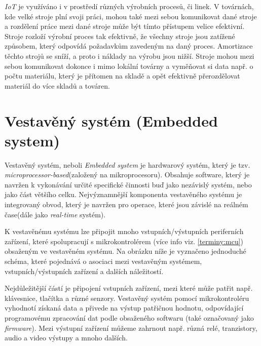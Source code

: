 \emph{IoT} je využíváno i v prostředí různých výrobních procesů, či linek.
V továrnách, kde velké stroje plní svoji práci, mohou také mezi sebou komunikovat dané stroje a rozdělení práce mezi dané stroje může být tímto přístupem velice efektivní.
Stroje rozloží výrobní proces tak efektivně, že všechny stroje jsou zatížené způsobem, který odpovídá požadavkům zavedeným na daný proces.
Amortizace těchto strojů se sníží, a proto i náklady na výrobu jsou nižší.
Stroje mohou mezi sebou komunikovat dokonce i mimo lokální továrny a vyměňovat si data např. o počtu materiálu, který je přítomen na skladě a opět efektivně přerozdělovat materiál do více skladů a továren.

\newpage

\section{Vestavěný systém (Embedded system)}
\label{terminy:vestaveny}

Vestavěný systém, neboli \emph{Embedded system} je hardwarový systém, který je tzv. \emph{microprocessor-based}(založený na mikroprocesoru).
Obsahuje software, který je navržen k vykonávání určité specifické činnosti buď jako nezávislý systém, nebo jako část většího celku.
Nejvýznamnější komponenta vestavěného systému je integrovaný obvod, který je navržen pro operace, které jsou závislé na reálném čase(dále jako \emph{real-time} systém).~\cite{embedded:info}

K vestavěnému systému lze připojit mnoho vstupních/výstupních periferních zařízení, které spolupracují s mikrokontrolérem (více info viz. \ref{terminy:mcu}) obsaženým ve vestavěném systému.
Na obrázku níže je vyznačeno jednoduché schéma, které pojednává o asociaci mezi vestavěným systémem, vstupních/výstupních zařízení a dalších náležitostí.

Nejdůležitější částí je připojení vstupních zařízení, mezi které může patřit např. klávesnice, tlačítka a různé senzory.
Vestavěný systém pomocí mikrokontroléru vyhodnotí získaná data a přivede na výstup patřičnou hodnotu, odpovídající programovému zpracování dat podle obsaženého softwaru (také označovaný jako \emph{firmware}).
Mezi výstupní zařízení můžeme zahrnout např. různá relé, tranzistory, audio a video výstupy a mnoho dalších.

